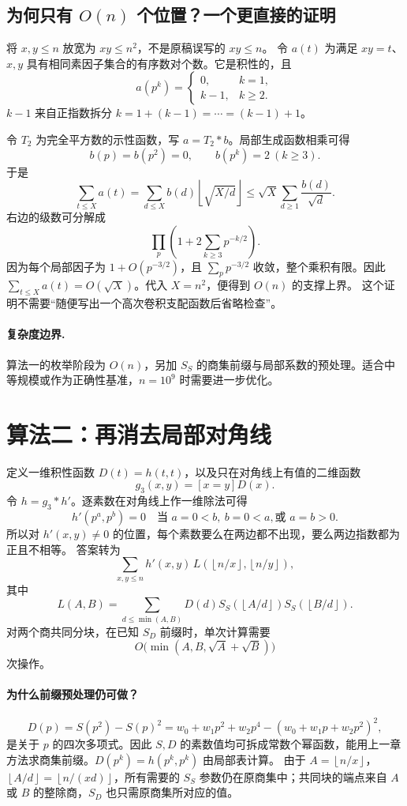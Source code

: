 \documentclass[UTF8,a4paper,11pt,twoside,openright,fontset=fandol]{ctexbook}
\theoremstyle{definition}
\newcommand{\floor}[1]{\left\lfloor #1\right\rfloor}
\begin{document}
\subsection{为何只有 \texorpdfstring{$O(n)$}{O(n)} 个位置？一个更直接的证明}
将 $x,y\le n$ 放宽为 $xy\le n^2$，不是原稿误写的 $xy\le n$。
令 $a(t)$ 为满足 $xy=t$、$x,y$ 具有相同素因子集合的有序数对个数。它是积性的，且
\[
 a(p^k)=\begin{cases}0,&k=1,\\k-1,&k\ge2.\end{cases}
\]
$k-1$ 来自正指数拆分 $k=1+(k-1)=\cdots=(k-1)+1$。

令 $T_2$ 为完全平方数的示性函数，写 $a=T_2*b$。局部生成函数相乘可得
\[
 b(p)=b(p^2)=0,\qquad b(p^k)=2\ (k\ge3).
\]
于是
\[
\sum_{t\le X}a(t)=\sum_{d\le X}b(d)\floor{\sqrt{X/d}}
\le\sqrt X\sum_{d\ge1}\frac{b(d)}{\sqrt d}.
\]
右边的级数可分解成
\[
 \prod_p\left(1+2\sum_{k\ge3}p^{-k/2}\right).
\]
因为每个局部因子为 $1+O(p^{-3/2})$，且 $\sum_p p^{-3/2}$ 收敛，整个乘积有限。因此 $\sum_{t\le X}a(t)=O(\sqrt X)$。代入 $X=n^2$，便得到 $O(n)$ 的支撑上界。
这个证明不需要“随便写出一个高次卷积支配函数后省略检查”。

\paragraph{复杂度边界.} 算法一的枚举阶段为 $O(n)$，另加 $S_S$ 的商集前缀与局部系数的预处理。适合中等规模或作为正确性基准，$n=10^9$ 时需要进一步优化。


\section{算法二：再消去局部对角线}
定义一维积性函数 $D(t)=h(t,t)$，以及只在对角线上有值的二维函数
\[
 g_3(x,y)=[x=y]D(x).
\]
令 $h=g_3*h'$。逐素数在对角线上作一维除法可得
\[
 h'(p^a,p^b)=0\quad\text{当 }a=0<b,\ b=0<a,\text{或 }a=b>0.
\]
所以对 $h'(x,y)\ne0$ 的位置，每个素数要么在两边都不出现，要么两边指数都为正且不相等。
答案转为
\[
 \sum_{x,y\le n}h'(x,y)\,L(\floor{n/x},\floor{n/y}),
\]
其中
\[
 L(A,B)=\sum_{d\le\min(A,B)}D(d)
 S_S(\floor{A/d})S_S(\floor{B/d}).
\]
对两个商共同分块，在已知 $S_D$ 前缀时，单次计算需要
\[
 O\bigl(\min(A,B,\sqrt A+\sqrt B)\bigr)
\]
次操作。


\paragraph{为什么前缀预处理仍可做？}
\[
 D(p)=S(p^2)-S(p)^2
 =w_0+w_1p^2+w_2p^4-(w_0+w_1p+w_2p^2)^2,
\]
是关于 $p$ 的四次多项式。因此 $S,D$ 的素数值均可拆成常数个幂函数，能用上一章方法求商集前缀。$D(p^k)=h(p^k,p^k)$ 由局部表计算。
由于 $A=\floor{n/x}$，$\floor{A/d}=\floor{n/(xd)}$，所有需要的 $S_S$ 参数仍在原商集中；共同块的端点来自 $A$ 或 $B$ 的整除商，$S_D$ 也只需原商集所对应的值。
\end{document}
